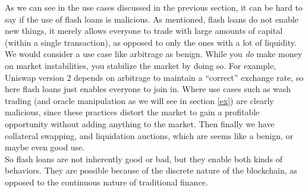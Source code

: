 As we can see in the use cases discussed in the previous section, it can be hard
to say if the use of flash loans is malicious. As mentioned, flash loans do not
enable new things, it merely allows everyone to trade with large amounts of
capital (within a single transaction), as opposed to only the ones with a lot of
liquidity. We would consider a use case like arbitrage as benign. While you
\textit{do} make money on market instabilities, you stabilize the market by
doing so. For example, Uniswap version 2 depends on arbitrage to maintain a
``correct'' exchange rate, so here flash loans just enables everyone to join in.
Where use cases such as wash trading (and oracle manipulation as we will see in
section \ref{ex}) are clearly malicious, since these practices distort the
market to gain a profitable opportunity without adding anything to the market.
Then finally we have collateral swapping, and liquidation auctions, which are
seems like a benign, or maybe even good use.\\

So flash loans are not inherently good or bad, but they enable both kinds of
behaviors. They are possible because of the discrete nature of the blockchain,
as opposed to the continuous nature of traditional finance.
